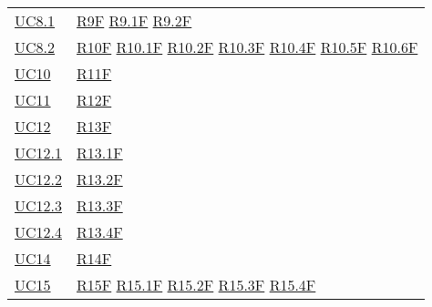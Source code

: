 \begin{center}
\begin{longtable}[!h]{m{50px} m{50px}}
        \hyperref[sec:UC8.1]{UC8.1}       & \hyperref[tab:RequisitiFunzionali]{R9F}
        \newline \hyperref[tab:RequisitiFunzionali]{R9.1F}
        \newline \hyperref[tab:RequisitiFunzionali]{R9.2F}                             \\

        \hyperref[sec:UC8.2]{UC8.2}       & \hyperref[tab:RequisitiFunzionali]{R10F}
        \newline \hyperref[tab:RequisitiFunzionali]{R10.1F}
        \newline \hyperref[tab:RequisitiFunzionali]{R10.2F}
        \newline \hyperref[tab:RequisitiFunzionali]{R10.3F}
        \newline \hyperref[tab:RequisitiFunzionali]{R10.4F}
        \newline \hyperref[tab:RequisitiFunzionali]{R10.5F}
        \newline \hyperref[tab:RequisitiFunzionali]{R10.6F}                            \\

        \hyperref[sec:UC10]{UC10}         & \hyperref[tab:RequisitiFunzionali]{R11F}   \\
        \hyperref[sec:UC11]{UC11}         & \hyperref[tab:RequisitiFunzionali]{R12F}   \\
        \hyperref[sec:UC12]{UC12}         & \hyperref[tab:RequisitiFunzionali]{R13F}   \\
        \hyperref[sec:UC12.1]{UC12.1}     & \hyperref[tab:RequisitiFunzionali]{R13.1F} \\
        \hyperref[sec:UC12.2]{UC12.2}     & \hyperref[tab:RequisitiFunzionali]{R13.2F} \\
        \hyperref[sec:UC12.3]{UC12.3}     & \hyperref[tab:RequisitiFunzionali]{R13.3F} \\
        \hyperref[sec:UC12.4]{UC12.4}     & \hyperref[tab:RequisitiFunzionali]{R13.4F} \\
        \hyperref[sec:UC14]{UC14}         & \hyperref[tab:RequisitiFunzionali]{R14F}   \\

        \hyperref[sec:UC15]{UC15}         & \hyperref[tab:RequisitiFunzionali]{R15F}
        \newline \hyperref[tab:RequisitiFunzionali]{R15.1F}
        \newline \hyperref[tab:RequisitiFunzionali]{R15.2F}
        \newline \hyperref[tab:RequisitiFunzionali]{R15.3F}
        \newline \hyperref[tab:RequisitiFunzionali]{R15.4F}                            \\


\end{longtable}
\end{center}
